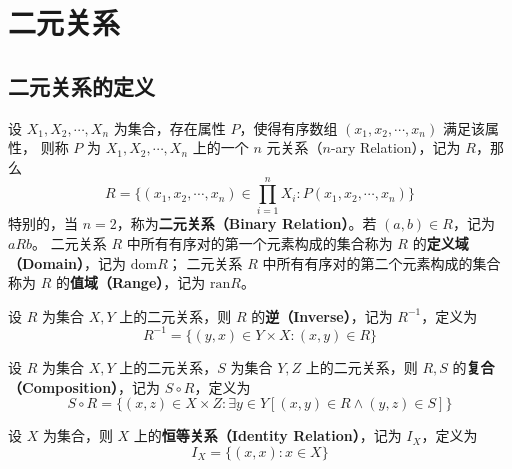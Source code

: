 \section{二元关系}
\subsection{二元关系的定义}
\begin{definition}[关系 Relation]
    设 $ X_1, X_2, \cdots, X_{n} $ 为集合，存在属性 $ P $，使得有序数组 $ (x_1, x_2, \cdots, x_n) $ 满足该属性，
    则称 $ P $ 为 $ X_1, X_2, \cdots, X_n $ 上的一个 $ n $ 元关系（$ n $-ary Relation），记为 $R$，那么
    \[
        R = \{(x_1, x_2, \cdots, x_n)\in \prod^n_{i=1}X_i : P(x_1, x_2, \cdots, x_n)\}
    \]  
    特别的，当 $ n=2 $，称为\textbf{二元关系（Binary Relation）}。若 $ (a,b)\in R $，记为 $ aRb $。
    二元关系 $ R $ 中所有有序对的第一个元素构成的集合称为 $ R $ 的\textbf{定义域（Domain）}，记为 $ \mathrm{dom}R $；
    二元关系 $ R $ 中所有有序对的第二个元素构成的集合称为 $ R $ 的\textbf{值域（Range）}，记为 $ \mathrm{ran}R $。
\end{definition}
\vspace{1em}

\begin{definition}
    设 $ R $ 为集合 $ X, Y $ 上的二元关系，则 $ R $ 的\textbf{逆（Inverse）}，记为 $ R^{-1} $，定义为
    \[
        R^{-1} = \{(y,x)\in Y\times X : (x,y)\in R\}
    \]
\end{definition}
\vspace{1em}

\begin{definition}
    设 $ R $ 为集合 $ X, Y $ 上的二元关系，$ S $ 为集合 $ Y, Z $ 上的二元关系，则 $ R, S $ 的\textbf{复合（Composition）}，记为 $ S\circ R $，定义为
    \[
        S\circ R = \{(x,z)\in X\times Z : \exists y\in Y[(x,y)\in R \land (y,z)\in S]\}
    \]
\end{definition}
\vspace{1em}

\begin{definition}
    设 $ X $ 为集合，则 $ X $ 上的\textbf{恒等关系（Identity Relation）}，记为 $ I_X $，定义为
    \[
        I_X = \{(x,x) : x\in X\}
    \]
\end{definition}

